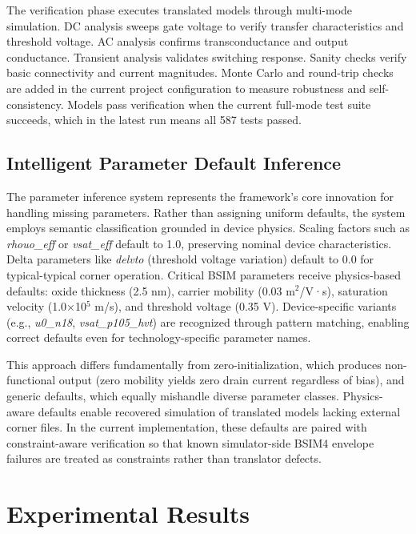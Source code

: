 \documentclass[10pt,twocolumn]{article}
\begin{document}
The verification phase executes translated models through multi-mode simulation. DC analysis sweeps gate voltage to verify transfer characteristics and threshold voltage. AC analysis confirms transconductance and output conductance. Transient analysis validates switching response. Sanity checks verify basic connectivity and current magnitudes. Monte Carlo and round-trip checks are added in the current project configuration to measure robustness and self-consistency. Models pass verification when the current full-mode test suite succeeds, which in the latest run means all 587 tests passed.

\subsection{Intelligent Parameter Default Inference}

The parameter inference system represents the framework's core innovation for handling missing parameters. Rather than assigning uniform defaults, the system employs semantic classification grounded in device physics. Scaling factors such as \textit{rhouo\_eff} or \textit{vsat\_eff} default to 1.0, preserving nominal device characteristics. Delta parameters like \textit{delvto} (threshold voltage variation) default to 0.0 for typical-typical corner operation. Critical BSIM parameters receive physics-based defaults: oxide thickness (2.5 nm), carrier mobility (0.03 m$^2$/V·s), saturation velocity (1.0×10$^5$ m/s), and threshold voltage (0.35 V). Device-specific variants (e.g., \textit{u0\_n18}, \textit{vsat\_p105\_hvt}) are recognized through pattern matching, enabling correct defaults even for technology-specific parameter names.

This approach differs fundamentally from zero-initialization, which produces non-functional output (zero mobility yields zero drain current regardless of bias), and generic defaults, which equally mishandle diverse parameter classes. Physics-aware defaults enable recovered simulation of translated models lacking external corner files. In the current implementation, these defaults are paired with constraint-aware verification so that known simulator-side BSIM4 envelope failures are treated as constraints rather than translator defects.

\section{Experimental Results}
\end{document}
